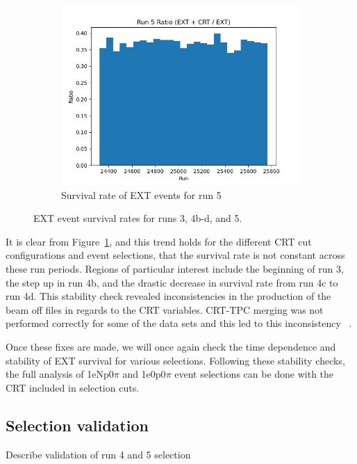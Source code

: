 \begin{figure}[H]
\begin{subfigure}[t]{0.3\linewidth}
        \includegraphics[width=\linewidth]{technote/EventSelections/FiguresCRT/run5fortalk.png}%
        \caption{Survival rate of EXT events for run 5}
    \end{subfigure}
    \caption{EXT event survival rates for runs 3, 4b-d, and 5. }
    \label{fig:EXT_survival_allruns}
\end{figure}

It is clear from Figure~\ref{fig:EXT_survival_allruns}, and this trend holds for the different CRT cut configurations and event selections, that the survival rate is not constant across these run periods. Regions of particular interest include the beginning of run 3, the step up in run 4b, and the drastic decrease in survival rate from run 4c to run 4d. This stability check revealed inconsistencies in the production of the beam off files in regards to the CRT variables. CRT-TPC merging was not performed correctly for some of the data sets and this led to this inconsistency ~\cite{Herb's presentation}. 

Once these fixes are made, we will once again check the time dependence and stability of EXT survival for various selections. Following these stability checks, the full analysis of 1eNp0$\pi$ and 1e0p0$\pi$ event selections can be done with the CRT included in selection cuts.

\subsection{Selection validation}
\label{sec:selvalid}
Describe validation of run 4 and 5 selection

